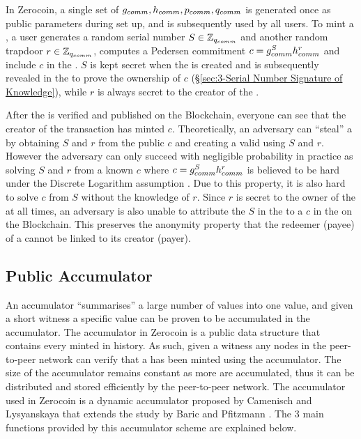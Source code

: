In Zerocoin, a single set of $g_{comm},h_{comm},p_{comm},q_{comm}$ is generated once as public parameters during set up, and is subsequently used by all users. To mint a \kwCoin{}, a user generates a random serial number $S\in\mathbb{Z}_{q_{comm}}$ and another random trapdoor $r\in\mathbb{Z}_{q_{comm}}$, computes a Pedersen commitment $c=g_{comm}^{S}h_{comm}^{r}$ and include $c$ in the . $S$ is kept secret when the  is created and is subsequently revealed in the  to prove the ownership of $c$ (\S\ref{sec:3-Serial Number Signature of Knowledge}), while $r$ is always secret to the creator of the . 

After the  is verified and published on the Blockchain, everyone can see that the creator of the transaction has minted $c$. Theoretically, an adversary can “steal” a \kwCoin{} by obtaining $S$ and $r$ from the public $c$ and creating a valid  using $S$ and $r$. However the adversary can only succeed with negligible probability in practice as solving $S$ and $r$ from a known $c$ where $c=g_{comm}^{S}h_{comm}^{r}$ is believed to be hard under the Discrete Logarithm assumption \cite{Paar2010}. Due to this property, it is also hard to solve $c$ from $S$ without the knowledge of $r$. Since $r$ is secret to the owner of the \kwCoin{} at all times, an adversary is also unable to attribute the $S$ in the  to a $c$ in the  on the Blockchain. This preserves the anonymity property that the redeemer (payee) of a \kwCoin{} cannot be linked to its creator (payer).

\subsection{Public Accumulator}
\label{sec:3-Public Accumulator}
An accumulator “summarises” a large number of values into one value, and given a short witness a specific value can be proven to be accumulated in the accumulator. The accumulator in Zerocoin is a public data structure that contains every minted \kwCoin{} in history. As such, given a witness any nodes in the peer-to-peer network can verify that a \kwCoin{} has been minted using the accumulator. The size of the accumulator remains constant as more  are accumulated, thus it can be distributed and stored efficiently by the peer-to-peer network. The accumulator used in Zerocoin is a dynamic accumulator proposed by Camenisch and Lysyanskaya \cite{JanCamenisch12002} that extends the study by Baric and Pfitzmann \cite{BariC1997}. The 3 main functions provided by this accumulator scheme are explained below. 


